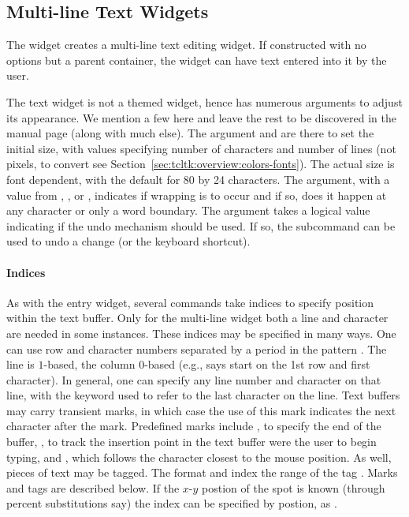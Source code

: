 \subsection{Multi-line Text Widgets}
\label{sec:tcltk:multi-line-text}

The  widget creates a multi-line text editing
widget. If constructed with no options but a parent container, the
widget can have text entered into it by the user.
%

The text widget is not a themed widget, hence has numerous arguments
to adjust its appearance. We mention a few here and leave the rest to
be discovered in the manual page (along with much else). The argument
 and  are there to
set the initial size, with values specifying number of characters and
number of lines (not pixels, to convert see
Section~\ref{sec:tcltk:overview:colors-fonts}). The actual size is
font dependent, with the default for 80 by 24 characters. The
 argument, with a value from ,
, or , indicates if wrapping is to occur and
if so, does it happen at any character or only a word boundary. The
argument  takes a logical value indicating if
the undo mechanism should be used. If so, the subcommand
 can be used to undo a change (or the
 keyboard shortcut).



\paragraph{Indices}
As with the entry widget, several commands take indices to specify
position within the text buffer. Only for the multi-line widget both a
line and character are needed in some instances. These indices may be
specified in many ways. One can use row and character numbers
separated by a period in the pattern . The line is
$1$-based, the column $0$-based (e.g.,  says start on the
1st row and first character). In general, one can specify any line
number and character on that line, with the keyword  used to
refer to the last character on the line. Text buffers may carry
transient marks, in which case the use of this mark indicates the next
character after the mark. Predefined marks include , to  specify the end of the
buffer, , to track the insertion point in the text
buffer were the user to begin typing, and , which 
follows the character closest to the mouse position. As well, pieces
of text may be tagged. The format  and 
index the range of the tag . Marks and tags are described
below. If the $x$-$y$ postion of the spot is known (through percent
substitutions say) the index can be specified by postion, as .

